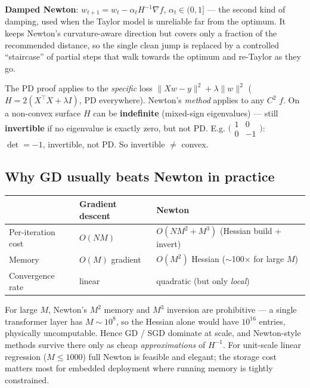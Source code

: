 \documentclass[11pt, a4paper]{article}
\newcommand{\thead}[1]{\textbf{#1}}
\newcommand{\kw}[1]{\textbf{#1}}
\begin{document}
\kw{Damped Newton}: $w_{t+1}=w_t-\alpha_t H^{-1}\nabla f$, $\alpha_t\in(0,1]$ — the second kind of
damping, used when the Taylor model is unreliable far from the optimum. It keeps Newton's
curvature-aware direction but covers only a fraction of the recommended distance, so the single clean
jump is replaced by a controlled ``staircase'' of partial steps that walk towards the optimum and
re-Taylor as they go.

\begin{trapbox}
The PD proof applies to the \emph{specific} loss $\|Xw-y\|^2+\lambda\|w\|^2$ ($H=2(X^\top X+\lambda I)$,
PD everywhere). Newton's \emph{method} applies to any $C^2$ $f$. On a non-convex surface $H$ can be
\kw{indefinite} (mixed-sign eigenvalues) — still \kw{invertible} if no eigenvalue is exactly zero,
but not PD. E.g. $\big(\begin{smallmatrix}1&0\\0&-1\end{smallmatrix}\big)$: $\det=-1$, invertible,
not PD. So invertible $\ne$ convex.
\end{trapbox}

\subsection{Why GD usually beats Newton in practice}

\begin{center}
\renewcommand{\arraystretch}{1.2}
\begin{tabularx}{\linewidth}{l l X}
\toprule
& \thead{Gradient descent} & \thead{Newton} \\
\midrule
Per-iteration cost & $O(NM)$ & $O(NM^2+M^3)$ (Hessian build + invert) \\
Memory & $O(M)$ gradient & $O(M^2)$ Hessian ($\sim$100$\times$ for large $M$) \\
Convergence rate & linear & quadratic (but only \emph{local}) \\
\bottomrule
\end{tabularx}
\end{center}
For large $M$, Newton's $M^2$ memory and $M^3$ inversion are prohibitive — a single transformer layer
has $M\sim10^8$, so the Hessian alone would have $10^{16}$ entries, physically uncomputable. Hence
GD / SGD dominate at scale, and Newton-style methods survive there only as cheap \emph{approximations}
of $H^{-1}$. For unit-scale linear regression ($M\le1000$) full Newton is feasible and elegant; the
storage cost matters most for embedded deployment where running memory is tightly constrained.
\end{document}
